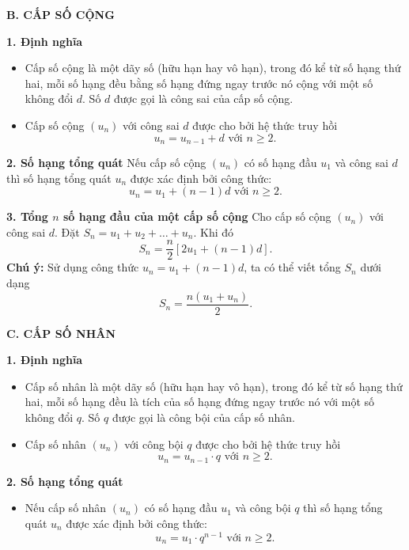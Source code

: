 \documentclass[12pt,a4paper]{extarticle}
\begin{document}
\noindent\textbf{B. CẤP SỐ CỘNG}

\noindent\textbf{1. Định nghĩa}
\begin{itemize}
    \item Cấp số cộng là một dãy số (hữu hạn hay vô hạn), trong đó kể từ số hạng thứ hai, mỗi số hạng đều bằng số hạng đứng ngay trước nó cộng với một số không đổi $d$. Số $d$ được gọi là công sai của cấp số cộng.
    \item Cấp số cộng $(u_n)$ với công sai $d$ được cho bởi hệ thức truy hồi
    \[ u_n = u_{n-1} + d \text{ với } n \ge 2. \]
\end{itemize}

\vspace{0.4cm}
\noindent\textbf{2. Số hạng tổng quát}
\noindent Nếu cấp số cộng $(u_n)$ có số hạng đầu $u_1$ và công sai $d$ thì số hạng tổng quát $u_n$ được xác định bởi công thức:
\[ u_n = u_1 + (n - 1)d \text{ với } n \ge 2. \]

\vspace{0.4cm}
\noindent\textbf{3. Tổng $n$ số hạng đầu của một cấp số cộng}
\noindent Cho cấp số cộng $(u_n)$ với công sai $d$. Đặt $S_n = u_1 + u_2 + \dots + u_n$. Khi đó
\[ S_n = \frac{n}{2}[2u_1 + (n - 1)d]. \]
\noindent\textbf{Chú ý:} Sử dụng công thức $u_n = u_1 + (n - 1)d$, ta có thể viết tổng $S_n$ dưới dạng
\[ S_n = \frac{n(u_1 + u_n)}{2}. \]

\vspace{0.6cm}
\noindent\textbf{C. CẤP SỐ NHÂN}

\noindent\textbf{1. Định nghĩa}
\begin{itemize}
    \item Cấp số nhân là một dãy số (hữu hạn hay vô hạn), trong đó kể từ số hạng thứ hai, mỗi số hạng đều là tích của số hạng đứng ngay trước nó với một số không đổi $q$. Số $q$ được gọi là công bội của cấp số nhân.
    \item Cấp số nhân $(u_n)$ với công bội $q$ được cho bởi hệ thức truy hồi
    \[ u_n = u_{n-1} \cdot q \text{ với } n \ge 2. \]
\end{itemize}

\vspace{0.4cm}
\noindent\textbf{2. Số hạng tổng quát}
\begin{itemize}
    \item Nếu cấp số nhân $(u_n)$ có số hạng đầu $u_1$ và công bội $q$ thì số hạng tổng quát $u_n$ được xác định bởi công thức:
    \[ u_n = u_1 \cdot q^{n-1} \text{ với } n \ge 2. \]
\end{itemize}
\end{document}
